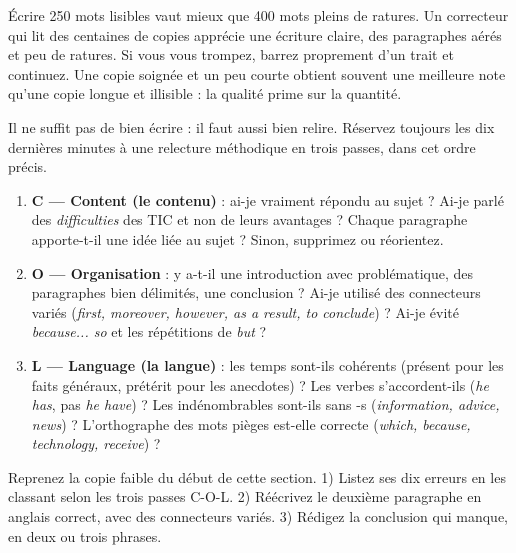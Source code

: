 \documentclass[11pt]{article}
\newcommand{\cle}[1]{{\popxbold\color{popdark}#1}}
\newcounter{popsec}
\newcounter{popsub}
\newcommand{\courssub}[1]{%
  \stepcounter{popsub}%
  \par\vspace{9pt}\noindent{\popxbold\fontsize{11.5}{13}\selectfont\color{popink}{\color{poporange}\thepopsec.\thepopsub}\hspace{6pt}#1}\par\nopagebreak\vspace{4pt}
}
\begin{document}
\begin{savaistu}
Écrire 250 mots lisibles vaut mieux que 400 mots pleins de ratures. Un correcteur qui lit des centaines de copies apprécie une écriture claire, des paragraphes aérés et peu de ratures. Si vous vous trompez, barrez proprement d'un trait et continuez. Une copie soignée et un peu courte obtient souvent une meilleure note qu'une copie longue et illisible : la qualité prime sur la quantité.
\end{savaistu}

\courssub{The C-O-L proofreading strategy}

Il ne suffit pas de bien écrire : il faut aussi bien \cle{relire}. Réservez toujours les dix dernières minutes à une relecture méthodique en trois passes, dans cet ordre précis.

\begin{methode}
\begin{enumerate}
\item \textbf{C — Content (le contenu)} : ai-je vraiment répondu au sujet ? Ai-je parlé des \emph{difficulties} des TIC et non de leurs avantages ? Chaque paragraphe apporte-t-il une idée liée au sujet ? Sinon, supprimez ou réorientez.
\item \textbf{O — Organisation} : y a-t-il une introduction avec problématique, des paragraphes bien délimités, une conclusion ? Ai-je utilisé des connecteurs variés (\emph{first, moreover, however, as a result, to conclude}) ? Ai-je évité \emph{because... so} et les répétitions de \emph{but} ?
\item \textbf{L — Language (la langue)} : les temps sont-ils cohérents (présent pour les faits généraux, prétérit pour les anecdotes) ? Les verbes s'accordent-ils (\emph{he has}, pas \emph{he have}) ? Les indénombrables sont-ils sans -s (\emph{information, advice, news}) ? L'orthographe des mots pièges est-elle correcte (\emph{which, because, technology, receive}) ?
\end{enumerate}
\end{methode}

\begin{exercice}
Reprenez la copie faible du début de cette section. 1) Listez ses dix erreurs en les classant selon les trois passes C-O-L. 2) Réécrivez le deuxième paragraphe en anglais correct, avec des connecteurs variés. 3) Rédigez la conclusion qui manque, en deux ou trois phrases.
\end{exercice}
\end{document}
